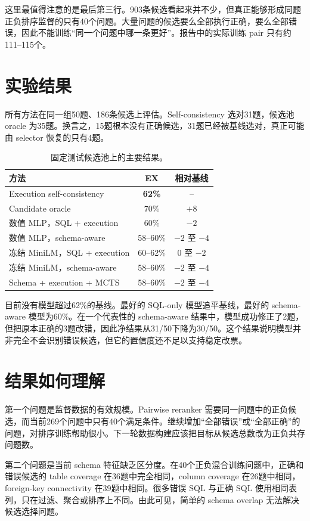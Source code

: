\documentclass[UTF8,11pt,fontset=windows]{ctexart}
\begin{document}
这里最值得注意的是最后第三行。903条候选看起来并不少，但真正能够形成同题正负排序监督的只有40个问题。大量问题的候选要么全部执行正确，要么全部错误，因此不能训练“同一个问题中哪一条更好”。报告中的实际训练 pair 只有约111--115个。

\section{实验结果}

所有方法在同一组50题、186条候选上评估。Self-consistency 选对31题，候选池 oracle 为35题。换言之，15题根本没有正确候选，31题已经被基线选对，真正可能由 selector 恢复的只有4题。

\begin{table}[ht]
\centering
\caption{固定测试候选池上的主要结果。}
\begin{tabularx}{0.88\textwidth}{Xcc}
\toprule
方法 & EX & 相对基线\\
\midrule
Execution self-consistency & \textbf{62\%} & --\\
Candidate oracle & 70\% & $+8$\\
数值 MLP，SQL + execution & 60\% & $-2$\\
数值 MLP，schema-aware & 58--60\% & $-2$ 至 $-4$\\
冻结 MiniLM，SQL + execution & 60--62\% & $0$ 至 $-2$\\
冻结 MiniLM，schema-aware & 58--60\% & $-2$ 至 $-4$\\
Schema + execution + MCTS & 58--60\% & $-2$ 至 $-4$\\
\bottomrule
\end{tabularx}
\end{table}

目前没有模型超过62\%的基线。最好的 SQL-only 模型追平基线，最好的 schema-aware 模型为60\%。在一个代表性的 schema-aware 结果中，模型成功修正了2题，但把原本正确的3题改错，因此净结果从31/50下降为30/50。这个结果说明模型并非完全不会识别错误候选，但它的置信度还不足以支持稳定改票。

\section{结果如何理解}

第一个问题是监督数据的有效规模。Pairwise reranker 需要同一问题中的正负候选，而当前269个问题中只有40个满足条件。继续增加“全部错误”或“全部正确”的问题，对排序训练帮助很小。下一轮数据构建应该把目标从候选总数改为正负共存问题数。

第二个问题是当前 schema 特征缺乏区分度。在40个正负混合训练问题中，正确和错误候选的 table coverage 在36题中完全相同，column coverage 在26题中相同，foreign-key connectivity 在39题中相同。很多错误 SQL 与正确 SQL 使用相同表列，只在过滤、聚合或排序上不同。由此可见，简单的 schema overlap 无法解决候选选择问题。
\end{document}
